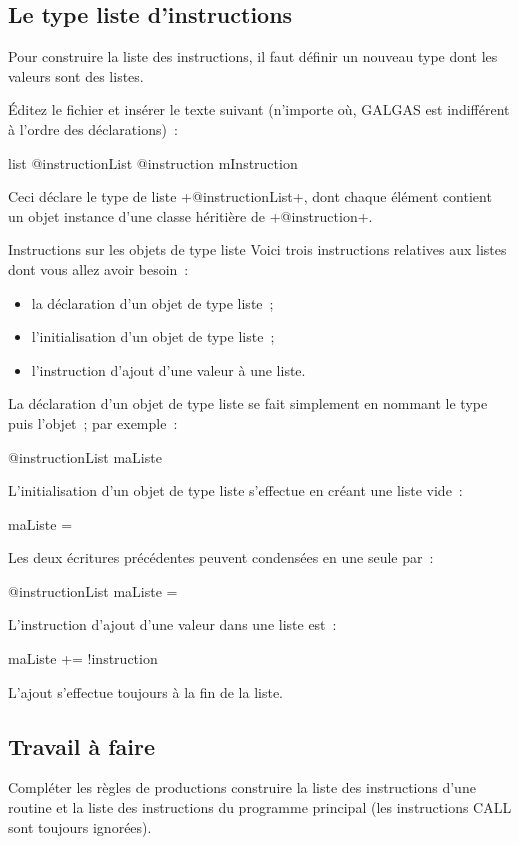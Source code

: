 \subsection{Le type liste d'instructions}
Pour construire la liste des instructions, il faut définir un nouveau type dont les valeurs sont des listes.

Éditez le fichier  et insérer le texte suivant (n’importe où, GALGAS est indifférent à l’ordre des déclarations)~:

\begin{galgas}
list @instructionList {
  @instruction mInstruction
}
\end{galgas}

Ceci déclare le type de liste \ggs+@instructionList+, dont chaque élément contient un objet instance d'une classe héritière de \ggs+@instruction+.

Instructions sur les objets de type liste
Voici trois instructions relatives aux listes dont vous allez avoir besoin~:
\begin{itemize}
  \item la déclaration d'un objet de type liste~;
  \item l'initialisation d'un objet de type liste~;
  \item l'instruction d'ajout d'une valeur à une liste.
\end{itemize}

La déclaration d'un objet de type liste se fait simplement en nommant le type puis l'objet~; par exemple~:
\begin{galgas}
@instructionList maListe
\end{galgas}

L'initialisation d'un objet de type liste s'effectue en créant une liste vide~:
\begin{galgas}
maListe = {}
\end{galgas}

Les deux écritures précédentes peuvent condensées en une seule par~:
\begin{galgas}
@instructionList maListe = {}
\end{galgas}

L'instruction d'ajout d'une valeur dans une liste est~:
\begin{galgas}
maListe += !instruction
\end{galgas}
L'ajout s'effectue toujours à la fin de la liste.

\subsection{Travail à faire}
Compléter les règles de productions construire la liste des instructions d'une routine et la liste des instructions du programme principal (les instructions CALL sont toujours ignorées).

